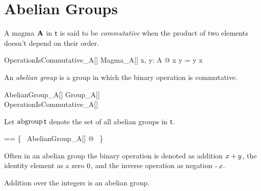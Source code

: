 \documentclass{amsart}
\begin{document}
\section{Abelian Groups}

A magma $\mathbf{A}$ in $\mathsf{t}$ is said to be {\em commutative} when the product of two elements doesn't depend on 
their order.
\begin{schema}{OperationIsCommutative\_A}[\genT]
	Magma\_A[\genT]
\where
	\forall x, y: A @ x \mulA y = y \mulA x
\end{schema}

An {\em abelian group} is a group in which the binary operation is commutative.
\begin{schema}{AbelianGroup\_A}[\genT]
	Group\_A[\genT] \\
	OperationIsCommutative\_A[\genT]
\end{schema}

Let $\operatorname{abgroup} \mathsf{t}$ denote the set of all abelian groups in $\mathsf{t}$.
\begin{zed}
	\abgroup \genT == \{~ AbelianGroup\_A[\genT] @ \strucA ~\}
\end{zed}

Often in an abelian group the binary operation is denoted as addition $x \mathbin{+} y$,
the identity element as a zero $0$, and the inverse operation as negation $\operatorname{-} x$.

\begin{example}
Addition over the integers is an abelian group.

\begin{zed}
	(\num, (\_ + \_)) \in \abgroup \num
\end{zed}

\end{example}

\printbibliography
\end{document}
